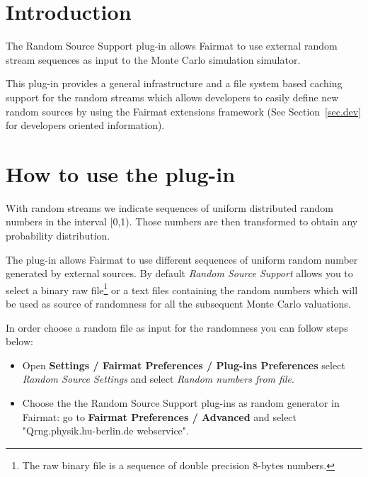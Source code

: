 \newcommand{\pluginName}{Random Sources Support}
\newcommand{\pluginVersion}{1.0}





\PluginTitle{\pluginName}{\pluginVersion}

\section{Introduction}

The Random Source Support plug-in allows Fairmat to use external random stream sequences as input to the Monte Carlo simulation simulator.

This plug-in provides a general infrastructure and a file system based caching support for the random streams which allows developers to easily define new random sources by using the Fairmat extensions framework (See Section~\ref{sec.dev} for developers oriented information). 

\section{How to use the plug-in}

With random streams we indicate sequences of uniform distributed random numbers in the interval [0,1). Those numbers are then transformed to obtain any probability distribution.

The plug-in allows Fairmat to use different sequences of uniform random number generated by external sources. 
By default \emph{Random Source Support} allows you to select a binary raw file\footnote{The raw binary file is a sequence of double precision 8-bytes numbers.} or a text files containing the random numbers which will be used as source of randomness for all the subsequent Monte Carlo valuations.

In order choose a random file as input for the randomness you can follow steps below:

\begin{itemize}
\item Open \textbf{Settings / Fairmat Preferences / Plug-ins Preferences} select \emph{Random Source Settings} and select \emph{Random numbers from file}.
\item Choose the  the Random Source Support plug-ins as random generator in Fairmat: go to \textbf{Fairmat Preferences / Advanced} and select "Qrng.physik.hu-berlin.de webservice".
\end{itemize}

